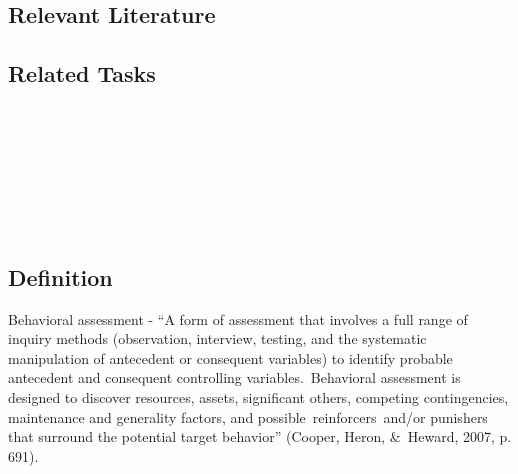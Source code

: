 \subsection{Relevant Literature}
\begin{refsection}
\nocite{test,alang2017police,clayton2018black}
\printbibliography[heading=none]
\end{refsection}
%
\subsection{Related Tasks} 
\fourgOne{}\\
\fourgThree{}\\
\fourgSix{}\\
\fourgSeven{}\\
\fourFKThirteen{}\\
\fourFKTwentySix{}\\
%
%
%
%
%
%
%
%
\section[\fourgThree{}]{\fourgThree{}%
              }
\subsection{Definition}
Behavioral assessment - ``A form of assessment that involves a full range of inquiry methods (observation, interview, testing, and the systematic manipulation of antecedent or consequent variables) to identify probable antecedent and consequent controlling variables. Behavioral assessment is designed to discover resources, assets, significant others, competing contingencies, maintenance and generality factors, and possible reinforcers and/or punishers that surround the potential target behavior'' (Cooper, Heron, \& Heward, 2007, p. 691).

